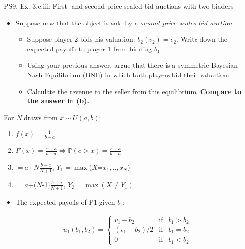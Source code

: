 \begin{frame}{PS9, Ex. 3.c.iii: First- and second-price sealed bid auctions with two bidders}
    \begin{multicols}{2}
      \begin{itemize}
        \item[(c)] Suppose now that the object is sold by a \textit{second-price sealed bid auction}.
        \begin{itemize}\normalsize
          \item[i.]   Suppose player 2 bids his valuation: $b_2(v_2) = v_2$. Write down the expected payoffs to player 1 from bidding $b_1$.
          \item[ii.]  Using your previous answer, argue that there is a symmetric Bayesian Nash Equilibrium (BNE) in which both players bid their valuation.
          \item[iii.] Calculate the revenue to the seller from this equilibrium. \textbf{Compare to the answer in (b).}
        \end{itemize}
      \end{itemize}
      For $N$ draws from $x\sim U(a, b):$
      \vspace{-6pt}
      \begin{enumerate}
        \item[PDF:] $f(x)=\frac{1}{b-a}$
        \item[CDF:] $F(x)=\frac{x-a}{b-a}\Rightarrow\mathbb{P}(c>x)=\frac{c-a}{b-a}$
        \item[$\mathbb{E}(Y_1)$] $=a$+$N\frac{b-a}{N+1}$, $Y_1=\max(X$=$x_1,..,x_N)$
        \item[$\mathbb{E}(Y_2)$] $=a$+$(N$-1$)\frac{b-a}{N+1}$, $Y_2=\max(X\neq Y_1)$
      \end{enumerate}
      \vfill\null\columnbreak
      \begin{itemize}
        \item[(i)] The expected payoffs of P1 given $b_2$:
      \end{itemize}
      \vspace{-16pt}
      \begin{align*}
        u_1(b_1,b_2)=\left\{\begin{array}{lcl}
          v_1-b_2     & \text{if} & b_1>b_2 \\
          (v_1-b_2)/2 & \text{if} & b_1=b_2 \\
          0           & \text{if} & b_1<b_2
        \end{array}\right.
      \end{align*}

\end{multicols}
\end{frame}
